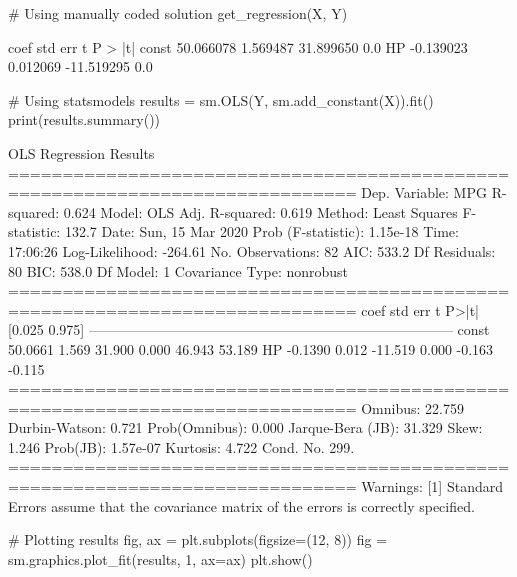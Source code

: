 \begin{python}
# Using manually coded solution
get_regression(X, Y)
\end{python}
\begin{console}
	coef	std err	t	P > |t|
const	50.066078	1.569487	31.899650	0.0
HP	-0.139023	0.012069	-11.519295	0.0
\end{console}

\begin{python}
# Using statsmodels
results = sm.OLS(Y, sm.add_constant(X)).fit()
print(results.summary())
\end{python}
\begin{console}
                            OLS Regression Results
==============================================================================
Dep. Variable:                    MPG   R-squared:                       0.624
Model:                            OLS   Adj. R-squared:                  0.619
Method:                 Least Squares   F-statistic:                     132.7
Date:                Sun, 15 Mar 2020   Prob (F-statistic):           1.15e-18
Time:                        17:06:26   Log-Likelihood:                -264.61
No. Observations:                  82   AIC:                             533.2
Df Residuals:                      80   BIC:                             538.0
Df Model:                           1
Covariance Type:            nonrobust
==============================================================================
                 coef    std err          t      P>|t|      [0.025      0.975]
------------------------------------------------------------------------------
const         50.0661      1.569     31.900      0.000      46.943      53.189
HP            -0.1390      0.012    -11.519      0.000      -0.163      -0.115
==============================================================================
Omnibus:                       22.759   Durbin-Watson:                   0.721
Prob(Omnibus):                  0.000   Jarque-Bera (JB):               31.329
Skew:                           1.246   Prob(JB):                     1.57e-07
Kurtosis:                       4.722   Cond. No.                         299.
==============================================================================
Warnings:
[1] Standard Errors assume that the covariance matrix of the errors is correctly
specified.
\end{console}

\begin{python}
# Plotting results
fig, ax = plt.subplots(figsize=(12, 8))
fig = sm.graphics.plot_fit(results, 1, ax=ax)
plt.show()
\end{python}

